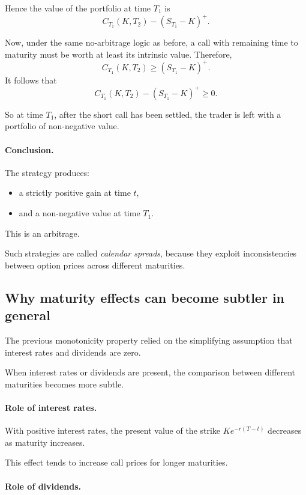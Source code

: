 \documentclass[11pt]{article}
\newcommand{\1}{\mathbf{1}}
\theoremstyle{plain}
\theoremstyle{definition}
\theoremstyle{remark}
\begin{document}
Hence the value of the portfolio at time \(T_1\) is
\[
C_{T_1}(K,T_2) - (S_{T_1}-K)^+.
\]

Now, under the same no-arbitrage logic as before, a call with remaining
time to maturity must be worth at least its intrinsic value. Therefore,
\[
C_{T_1}(K,T_2)\ge (S_{T_1}-K)^+.
\]
It follows that
\[
C_{T_1}(K,T_2) - (S_{T_1}-K)^+ \ge 0.
\]

So at time \(T_1\), after the short call has been settled, the trader is
left with a portfolio of non-negative value.

\paragraph{Conclusion.}
The strategy produces:
\begin{itemize}[leftmargin=1.4em]
    \item a strictly positive gain at time \(t\),
    \item and a non-negative value at time \(T_1\).
\end{itemize}
This is an arbitrage.

Such strategies are called \emph{calendar spreads}, because they exploit
inconsistencies between option prices across different maturities.

\subsection{Why maturity effects can become subtler in general}

The previous monotonicity property relied on the simplifying
assumption that interest rates and dividends are zero.

When interest rates or dividends are present,
the comparison between different maturities becomes more subtle.

\paragraph{Role of interest rates.}

With positive interest rates, the present value of the strike
\(K e^{-r(T-t)}\) decreases as maturity increases.

This effect tends to increase call prices for longer maturities.

\paragraph{Role of dividends.}
\end{document}
